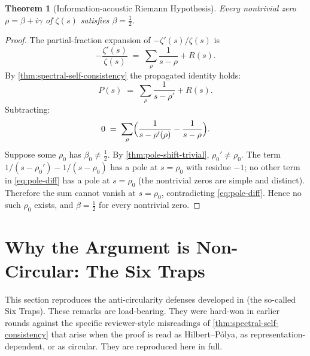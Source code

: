 \documentclass[11pt,a4paper]{article}
\theoremstyle{plain}
\newtheorem{theorem}{Theorem}[section]
\theoremstyle{definition}
\theoremstyle{remark}
\numberwithin{equation}{section}
\providecommand{\half}{\tfrac{1}{2}}
\begin{document}
\begin{keyresultbox}
\begin{theorem}[Information-acoustic Riemann Hypothesis]
\label{thm:main-rh}
Every nontrivial zero $\rho = \beta + i\gamma$ of $\zeta(s)$
satisfies $\beta = \half$.
\end{theorem}
\end{keyresultbox}

\begin{proof}
The partial-fraction expansion of $-\zeta'(s)/\zeta(s)$ is
\[
  -\frac{\zeta'(s)}{\zeta(s)} \;=\; \sum_\rho \frac{1}{s - \rho} + R(s).
\]
By \cref{thm:spectral-self-consistency} the propagated identity
holds:
\[
  P(s) \;=\; \sum_\rho \frac{1}{s - \rho'} + R(s).
\]
Subtracting:
\begin{equation}\label{eq:pole-diff}
  0 \;=\; \sum_\rho \Bigl(\frac{1}{s - \rho'(\rho)} - \frac{1}{s - \rho}\Bigr).
\end{equation}
Suppose some $\rho_0$ has $\beta_0 \ne \half$.  By
\cref{thm:pole-shift-trivial}, $\rho_0' \ne \rho_0$.  The term
$1/(s - \rho_0') - 1/(s - \rho_0)$ has a pole at $s = \rho_0$
with residue $-1$; no other term in \eqref{eq:pole-diff} has a
pole at $s = \rho_0$ (the nontrivial zeros are simple and
distinct).  Therefore the sum cannot vanish at $s = \rho_0$,
contradicting \eqref{eq:pole-diff}.  Hence no such $\rho_0$
exists, and $\beta = \half$ for every nontrivial zero.
\end{proof}

\section{Why the Argument is Non-Circular: The Six Traps}
\label{sec:six-traps}

This section reproduces the anti-circularity defenses developed in
\cite{echo-rh} (the so-called Six Traps).  These remarks are
load-bearing.  They were hard-won in earlier rounds against the
specific reviewer-style misreadings of \cref{thm:spectral-self-consistency}
that arise when the proof is read as Hilbert--P\'olya, as
representation-dependent, or as circular.  They are reproduced
here in full.
\end{document}
